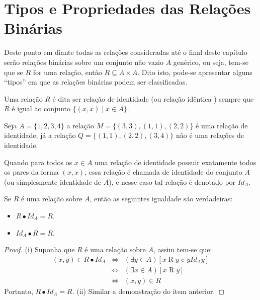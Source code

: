 \section{Tipos e Propriedades das Relações Binárias}

Deste ponto em diante todas as relações consideradas até o final deste capítulo serão relações binárias sobre um conjunto não vazio $A$ genérico, ou seja, tem-se que se $R$ for uma relação, então $R \subseteq A \times A$. Dito isto, pode-se apresentar alguns ``tipos'' em que as relações binárias podem ser classificadas.

\begin{definition}\label{def:RelacaoIdentica}
	Uma relação $R$ é dita ser relação de identidade (ou relação idêntica \cite{abe1991-TC}) sempre que $R$ é igual ao conjunto $\{(x, x) \mid x \in A\}$.
\end{definition}

\begin{exem}
	Seja $A = \{1, 2, 3, 4\}$ a relação $M = \{(3, 3), (1, 1), (2,2)\}$ é uma relação de identidade, já a relação $Q = \{(1, 1), (2,2), (3,4)\}$ não é uma relações de identidade.
\end{exem}

\begin{rema}
	Quando para todos os $x \in A$ uma relação de identidade possuir exatamente todos os pares da forma $(x, x)$, essa relação é chamada de identidade do conjunto $A$ (ou simplesmente identidade de $A$), e nesse caso tal relação é denotado por $Id_A$.
\end{rema}

\begin{theorem}\label{teo:NeutralidadeRelacaoIdentidade}
	Se $R$ é uma relação sobre $A$, então as seguintes igualdade são verdadeiras:
	\begin{itemize}
		\item[(i)] $R \bullet Id_A = R$.
		\item[(ii)] $Id_A \bullet R = R$.
	\end{itemize}
\end{theorem}

\begin{proof}
	(i) Suponha que $R$ é uma relação sobre $A$, assim tem-se que:
	\begin{eqnarray*}
		(x, y) \in R \bullet Id_A  & \Longleftrightarrow & (\exists y \in A)[x \mathrel{R} y \text{ e } y \mathrel{Id_A} y]\\
		& \Longleftrightarrow & (\exists x \in A)[x \mathrel{R} y]\\
		& \Longleftrightarrow & (x, y) \in R 
	\end{eqnarray*}
	Portanto,  $R \bullet Id_A = R$. (ii) Similar a demonstração do item anterior.
\end{proof}

